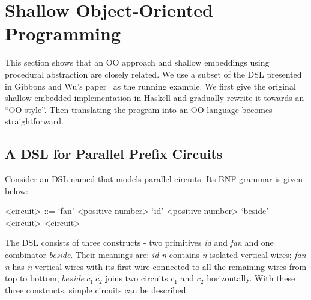 \section{Shallow Object-Oriented Programming}\label{sec:oo}

\begin{comment}
Weixin writes this part.

Argue that shallow embeddings and straightforward OO 
programs are essentially the same thing. 

Start from a simple shallow DSL in Haskell, 
and iterate throught it until you reach a form 
that looks like an OO program.

Show how todo transformations in Shallow embeddings
using the insight of how to do transformations in OO
programs.

Show the correponding Java programs and the Java program 
with transformation that we can port back to Haskell.
\end{comment}

This section shows that an OO approach and shallow embeddings using
procedural abstraction are closely related.  We use a subset of the
DSL presented in Gibbons and Wu's paper~\cite{gibbons2014folding} as
the running example.  We first give the original shallow embedded
implementation in Haskell and gradually rewrite it towards an ``OO
style''.  Then translating the program into an OO language becomes
straightforward.

\subsection{A DSL for Parallel Prefix Circuits}
Consider an DSL named \dsl that models parallel circuits.
Its BNF grammar is given below:
\setlength{\grammarindent}{5em} %

\begin{grammar}
<circuit> ::= `fan' <positive-number>
\alt `id' <positive-number>
\alt `beside' <circuit> <circuit>
\end{grammar}

The DSL consists of three constructs - two primitives
\emph{id} and \emph{fan} and one combinator \emph{beside}.
Their meanings are: \emph{id n} contains \emph{n} isolated vertical wires;
\emph{fan n} has \emph{n} vertical wires with its first wire connected to
all the remaining wires from top to bottom; $beside\ c_1\ c_2$ joins two circuits
$c_1$ and $c_2$ horizontally.
With these three constructs, simple circuits can be described.

